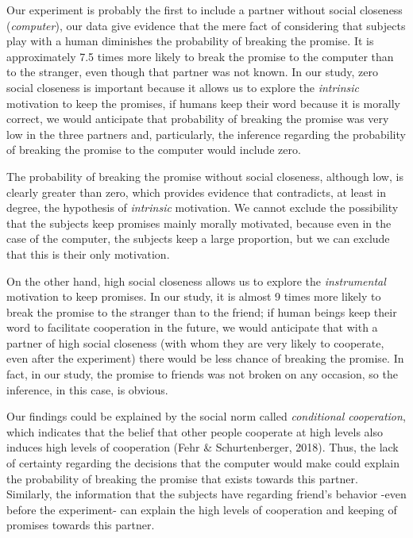 \documentclass[12pt,]{article}
\begin{document}
Our experiment is probably the first to include a partner without social
closeness (\emph{computer}), our data give evidence that the mere fact
of considering that subjects play with a human diminishes the
probability of breaking the promise. It is approximately 7.5 times more
likely to break the promise to the computer than to the stranger, even
though that partner was not known. In our study, zero social closeness
is important because it allows us to explore the \emph{intrinsic}
motivation to keep the promises, if humans keep their word because it is
morally correct, we would anticipate that probability of breaking the
promise was very low in the three partners and, particularly, the
inference regarding the probability of breaking the promise to the
computer would include zero.

The probability of breaking the promise without social closeness,
although low, is clearly greater than zero, which provides evidence that
contradicts, at least in degree, the hypothesis of \emph{intrinsic}
motivation. We cannot exclude the possibility that the subjects keep
promises mainly morally motivated, because even in the case of the
computer, the subjects keep a large proportion, but we can exclude that
this is their only motivation.

On the other hand, high social closeness allows us to explore the
\emph{instrumental} motivation to keep promises. In our study, it is
almost 9 times more likely to break the promise to the stranger than to
the friend; if human beings keep their word to facilitate cooperation in
the future, we would anticipate that with a partner of high social
closeness (with whom they are very likely to cooperate, even after the
experiment) there would be less chance of breaking the promise. In fact,
in our study, the promise to friends was not broken on any occasion, so
the inference, in this case, is obvious.

Our findings could be explained by the social norm called
\emph{conditional cooperation}, which indicates that the belief that
other people cooperate at high levels also induces high levels of
cooperation (Fehr \& Schurtenberger, 2018). Thus, the lack of certainty
regarding the decisions that the computer would make could explain the
probability of breaking the promise that exists towards this partner.
Similarly, the information that the subjects have regarding friend's
behavior -even before the experiment- can explain the high levels of
cooperation and keeping of promises towards this partner.
\end{document}
